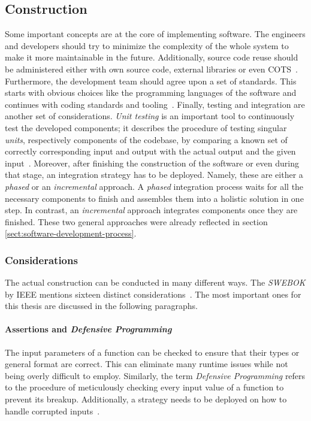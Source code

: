 \documentclass[12pt,a4paper,twoside]{report}
\begin{document}
\subsection{Construction} \label{subsect:construction}

Some important concepts are at the core of implementing software.
The engineers and developers should try to minimize the complexity of the whole system
to make it more maintainable in the future.
Additionally, source code reuse should be administered either with own source code,
external libraries or even COTS~\cite{swebok}.
Furthermore, the development team should agree upon a set of standards.
This starts with obvious choices like the programming languages of the software
and continues with coding standards and tooling~\cite{mcconnell-code-complete}.
Finally, testing and integration are another set of considerations.
\textit{Unit testing} is an important tool to continuously test the developed components;
it describes the procedure of testing singular \textit{units}, respectively components
of the codebase, by comparing a known set of correctly corresponding input and output
with the actual output and the given input~\cite{testing}.
Moreover, after finishing the construction of the software or even during that stage,
an integration strategy has to be deployed. Namely, these are either a
\textit{phased} or an \textit{incremental} approach. A \textit{phased} integration
process waits for all the necessary components to finish and assembles them into a
holistic solution in one step. In contrast, an \textit{incremental} approach
integrates components once they are finished. These two general approaches
were already reflected in section \ref{sect:software-development-process}.

\subsubsection{Considerations}
The actual construction can be conducted in many different ways.
The \textit{SWEBOK} by IEEE mentions sixteen distinct considerations~\cite{swebok}.
The most important ones for this thesis are discussed in the following paragraphs.

\paragraph{Assertions and \textit{Defensive Programming}}
The input parameters of a function can be checked to ensure that their types
or general format are correct. This can eliminate many runtime issues while not
being overly difficult to employ. Similarly, the term \textit{Defensive Programming}
refers to the procedure of meticulously checking every input value of a function
to prevent its breakup. Additionally, a strategy needs to be deployed on how to
handle corrupted inputs~\cite{swebok}.
\end{document}
